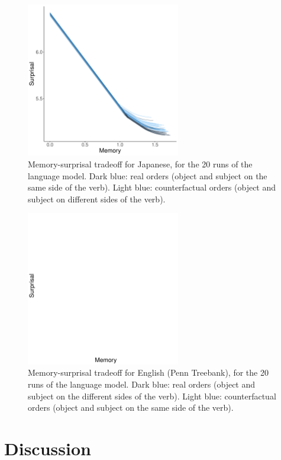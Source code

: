 \documentclass[11pt,a4paper]{article}
\begin{document}
\begin{figure}
    \centering
    \includegraphics[width=0.6\textwidth]{figures/japanese-memsurp.pdf}
\caption{Memory-surprisal tradeoff for Japanese, for the 20 runs of the language model. Dark blue: real orders (object and subject on the same side of the verb). Light blue: counterfactual orders (object and subject on different sides of the verb).}\label{fig:memsurp-jap}
\end{figure}


\begin{figure}
    \centering
    \includegraphics[width=0.6\textwidth]{figures/ptb-memsurp.pdf}
\caption{Memory-surprisal tradeoff for English (Penn Treebank), for the 20 runs of the language model. Dark blue: real orders (object and subject on the different sides of the verb). Light blue: counterfactual orders (object and subject on the same side of the verb).}\label{fig:memsurp-ptb}
\end{figure}


\section{Discussion}
\end{document}

